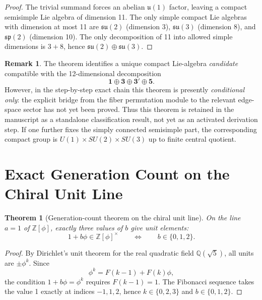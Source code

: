 \documentclass[12pt,a4paper]{article}
\newtheorem{theorem}{Theorem}
\theoremstyle{definition}
\newtheorem{remark}{Remark}
\begin{document}
\begin{proof}
The trivial summand forces an abelian $\mathfrak{u}(1)$ factor, leaving a compact semisimple Lie algebra of dimension 11.  The only simple compact Lie algebras with dimension at most 11 are $\mathfrak{su}(2)$ (dimension 3), $\mathfrak{su}(3)$ (dimension 8), and $\mathfrak{sp}(2)$ (dimension 10).  The only decomposition of 11 into allowed simple dimensions is $3+8$, hence $\mathfrak{su}(2)\oplus\mathfrak{su}(3)$.
\end{proof}

\begin{remark}
The theorem identifies a unique compact Lie-algebra \emph{candidate}
compatible with the 12-dimensional decomposition
\[
\mathbf{1}\oplus \mathbf{3}\oplus \mathbf{3'}\oplus \mathbf{5}.
\]
However, in the step-by-step exact chain this theorem is presently
\emph{conditional only}: the explicit bridge from the fiber permutation module
to the relevant edge-space sector has not yet been proved.  Thus this theorem
is retained in the manuscript as a standalone classification result, not yet as
an activated derivation step.  If one further fixes the simply connected
semisimple part, the corresponding compact group is $U(1)\times SU(2)\times
SU(3)$ up to finite central quotient.
\end{remark}

\section{Exact Generation Count on the Chiral Unit Line}

\begin{theorem}[Generation-count theorem on the chiral unit line]
\label{thm:gen_exact}
On the line $a=1$ of $\mathbb{Z}[\phi]$, exactly three values of $b$ give unit elements:
\begin{equation}
1+b\phi \in \mathbb{Z}[\phi]^\times
\qquad\Longleftrightarrow\qquad
b\in\{0,1,2\}.
\end{equation}
\end{theorem}

\begin{proof}
By Dirichlet's unit theorem for the real quadratic field $\mathbb{Q}(\sqrt{5})$, all units are $\pm \phi^k$.  Since
\[
\phi^k=F(k-1)+F(k)\phi,
\]
the condition $1+b\phi=\phi^k$ requires $F(k-1)=1$.  The Fibonacci sequence takes the value 1 exactly at indices $-1,1,2$, hence $k\in\{0,2,3\}$ and $b\in\{0,1,2\}$.
\end{proof}
\end{document}
